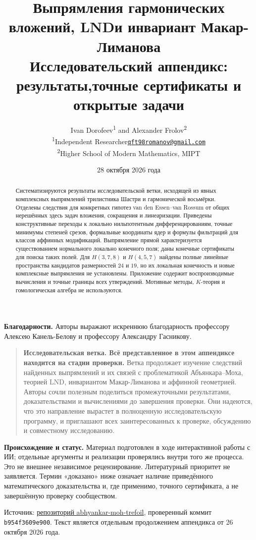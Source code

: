 \documentclass[11pt,a4paper]{article}
\title{\vspace{-12mm}\LARGE\bfseries Выпрямления гармонических вложений, LND\newline и инвариант Макар-Лиманова\\[5pt]\large Исследовательский аппендикс: результаты,\newline точные сертификаты и открытые задачи}
\author{Ivan Dorofeev\textsuperscript{1} and Alexander Frolov\textsuperscript{2}\\[3pt]
\normalsize\textsuperscript{1}Independent Researcher\enspace\textperiodcentered\enspace\href{mailto:qft98romanov@gmail.com}{\texttt{qft98romanov@gmail.com}}\\
\normalsize\textsuperscript{2}Higher School of Modern Mathematics, MIPT}
\date{28 октября 2026 года}
\begin{document}
\raggedright
\maketitle\thispagestyle{empty}\vspace{-12mm}
\begin{abstract}
Систематизируются результаты исследовательской ветки, исходящей из явных
комплексных выпрямлений трилистника Шастри и гармонической восьмёрки.
Отделены следствия для конкретных гипотез van den Essen--van Rossum от
общих нерешённых здесь задач вложения, сокращения и линеаризации.
Приведены конструктивные переходы к локально нильпотентным дифференцированиям,
точные минимумы степеней срезов, формальные координаты ядер и формулы
фильтраций для классов аффинных модификаций. Выпрямление прямой
характеризуется существованием нормального локально конечного поля;
даны конечные сертификаты для поиска таких полей. Для $H(3,7,8)$ и
$H(4,5,7)$ найдены полные линейные пространства кандидатов размерностей
$24$ и $19$, но их локальная конечность и новые комплексные выпрямления
не установлены. Приложение содержит воспроизводимые вычисления и точные
границы всех утверждений. Мотивные методы, $K$-теория и гомологическая
алгебра не используются.
\end{abstract}
\smallskip
\textbf{Благодарности.} Авторы выражают искреннюю благодарность
профессору Алексею Канель-Белову и профессору Александру Гасникову.
\begin{quote}\small
\textbf{Исследовательская ветка. Всё представленное в этом аппендиксе
находится на стадии проверки.} Ветка продолжает изучение следствий
найденных выпрямлений и их связей с проблематикой Абъянкара--Моха,
теорией LND, инвариантом Макар-Лиманова и аффинной геометрией.
Авторы сочли полезным поделиться промежуточными результатами, доказательствами
и вычислениями до завершения проверки. Они надеются, что это направление
вырастет в полноценную исследовательскую программу, и приглашают всех
заинтересованных к проверке, обсуждению и совместному исследованию.
\end{quote}
\smallskip
\textbf{Происхождение и статус.} Материал подготовлен в ходе интерактивной
работы с ИИ; отдельные аргументы и реализации проверялись внутри того же
процесса. Это не внешнее независимое рецензирование. Литературный приоритет
не заявляется. Термин «доказано» ниже означает наличие приведённого
математического доказательства и, где применимо, точного сертификата,
а не завершённую проверку сообществом.

Источник: \href{https://github.com/qft98romanov-hash/abhyankar-moh-trefoil}{репозиторий abhyankar-moh-trefoil},
проверенный коммит \texttt{b954f3609e900}.
Текст является отдельным продолжением аппендикса от 26 октября 2026 года.
\newpage\tableofcontents\newpage







\end{document}
